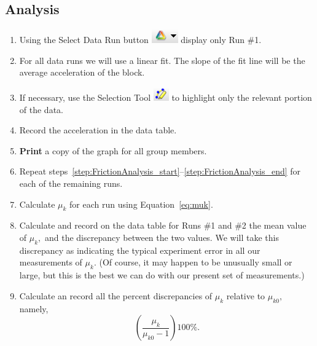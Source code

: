 \documentclass[main.tex]{subfiles}
\begin{document}
\subsection*{Analysis}
\begin{enumerate}
\item \label{step:FrictionAnalysis_start}
Using the Select Data Run button \includegraphics{Select_Data_Run} display only Run \#1.
\item
For all data runs we will use a linear fit. The slope of the fit line will be the average acceleration of the block.
\item
If necessary, use the Selection Tool \includegraphics{Selection_Tool} to highlight only the relevant portion of the data. 
\item \label{step:FrictionAnalysis_end}
Record the acceleration in the data table.
\item
\textbf{Print} a copy of the graph for all group members.
\item
Repeat steps~\ref{step:FrictionAnalysis_start}--\ref{step:FrictionAnalysis_end} for each of the remaining runs.
\item
Calculate $\mu_k$ for each run using Equation~\eqref{eq:muk}.
\item
Calculate and record on the data table for Runs \#1 and \#2 the mean value of $\mu_k,$ and the discrepancy between the two values. We will take this discrepancy as indicating the typical experiment error in all our measurements of $\mu_k.$ (Of course, it may happen to be unusually small or large, but this is the best we can do with our present set of measurements.)
\item
Calculate an record all the percent discrepancies of $\mu_k$ relative to $\mu_{k0},$ namely,
\[
\left(\frac{\mu_k}{\mu_{k0}-1}\right)100\%.
\]
\end{enumerate}
\end{document}
